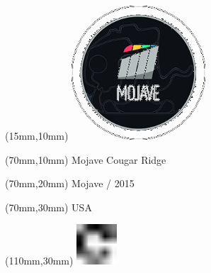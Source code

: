 \null\newpage
\begin{textblock*}{50mm}(15mm,10mm)%
\includegraphics[width=50mm]{LG/MOJ.png}
\end{textblock*}
\begin{textblock*}{130mm}(70mm,10mm)%
{\fontsize{20}{20}\selectfont Mojave Cougar Ridge}\\
\end{textblock*}
\begin{textblock*}{120mm}(70mm,20mm)%
{\fontsize{16}{16}\selectfont Mojave / 2015}\\
\end{textblock*}
\begin{textblock*}{120mm}(70mm,30mm)%
{\fontsize{12}{12}\selectfont USA}
\end{textblock*}
\begin{textblock*}{30mm}(110mm,30mm)%
\centering
\includegraphics[height=15mm]{icons/fa-rotate-right.pdf}
\end{textblock*}
